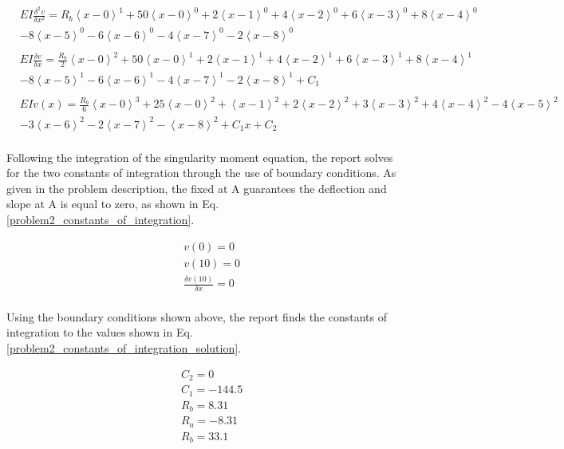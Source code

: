 \documentclass[a4paper]{article}
\begin{document}
\begin{equation}
    \begin{split}
& EI \frac{\delta^2 v}{\delta x^2} = R_b\left<x-0\right>^1 + 50\left<x-0\right>^0 + 2\left<x-1\right>^0 + 4\left<x-2\right>^0 + 6\left<x-3\right>^0 + 8\left<x-4\right>^0    \\
& -  8\left<x-5\right>^0 - 6\left<x-6\right>^0 -  4\left<x-7\right>^0 - 2\left<x-8\right>^0 \\
& \\
& EI \frac{\delta v}{\delta x} = \frac{R_b}{2}\left<x-0\right>^2 + 50\left<x-0\right>^1 + 2\left<x-1\right>^1 + 4\left<x-2\right>^1 +  6\left<x-3\right>^1 + 8\left<x-4\right>^1  \\
& -  8\left<x-5\right>^1 - 6\left<x-6\right>^1 -  4\left<x-7\right>^1 - 2\left<x-8\right>^1 + C_1 \\
& \\
& EI v(x) = \frac{R_b}{6}\left<x-0\right>^3 + 25\left<x-0\right>^2 + \left<x-1\right>^2 + 2\left<x-2\right>^2 +  3\left<x-3\right>^2 + 4\left<x-4\right>^2   -  4\left<x-5\right>^2 \\
& - 3\left<x-6\right>^2  -  2\left<x-7\right>^2 - \left<x-8\right>^2 + C_1 x + C_2 \\
    \end{split}
\label{problem2_equations}
\end{equation}

Following the integration of the singularity moment equation, the report solves for the two constants of integration through the use of boundary conditions. As given in the problem description, the fixed at A guarantees the deflection and slope at A is equal to zero, as shown in Eq. \ref{problem2_constants_of_integration}.

\begin{equation}
\begin{split}
	& v(0) = 0 \\
	& v(10) = 0 \\
	& \frac{\delta v(10)}{\delta x} = 0 \\
\end{split}
\label{problem2_constants_of_integration}
\end{equation}

Using the boundary conditions shown above, the report finds the constants of integration to the values shown in Eq. \ref{problem2_constants_of_integration_solution}.

\begin{equation}
\begin{split}
	& C_2 = 0 \\
	& C_1 = - 144.5 \\
	& R_b = 8.31\\
	& R_a = - 8.31 \\
	& R_b = 33.1 \\
\end{split}
\label{problem2_constants_of_integration_solution}
\end{equation}
\end{document}
